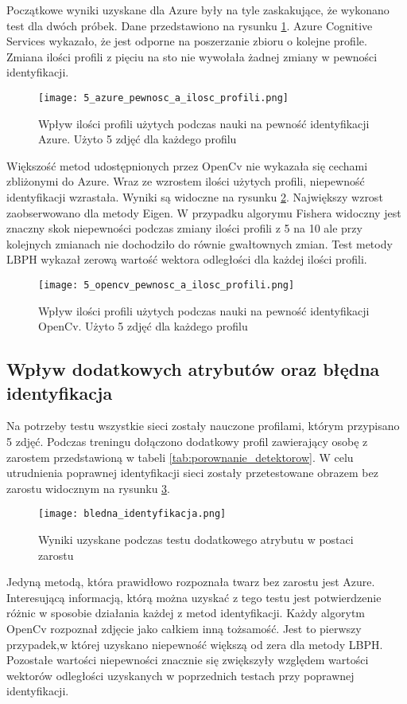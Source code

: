 Początkowe wyniki uzyskane dla Azure były na tyle zaskakujące, że wykonano test dla dwóch próbek. Dane przedstawiono na rysunku \ref{fig:azure_5__profile}. Azure Cognitive Services wykazało, że jest odporne na poszerzanie zbioru o kolejne profile. Zmiana ilości profili z pięciu na sto nie wywołała żadnej zmiany w pewności identyfikacji.
\begin{figure}[H]
	\centering
	\texttt{[image: 5\_azure\_pewnosc\_a\_ilosc\_profili.png]}
	\caption{Wpływ ilości profili użytych podczas nauki na pewność identyfikacji Azure. Użyto 5 zdjęć dla każdego profilu}
	\label{fig:azure_5__profile}
\end{figure}
Większość metod udostępnionych przez OpenCv nie wykazała się cechami zbliżonymi do Azure. Wraz ze wzrostem ilości użytych profili, niepewność identyfikacji wzrastała. Wyniki są widoczne na rysunku \ref{fig:opencv_5__profile}. Największy wzrost zaobserwowano dla metody Eigen. W przypadku algorymu Fishera widoczny jest znaczny skok niepewności podczas zmiany ilości profili z 5 na 10 ale przy kolejnych zmianach nie dochodziło do równie gwałtownych zmian. Test metody LBPH wykazał zerową wartość wektora odległości dla każdej ilości profili.
\begin{figure}[H]
	\centering
	\texttt{[image: 5\_opencv\_pewnosc\_a\_ilosc\_profili.png]}
	\caption{Wpływ ilości profili użytych podczas nauki na pewność identyfikacji OpenCv. Użyto 5 zdjęć dla każdego profilu}
	\label{fig:opencv_5__profile}
\end{figure}

\subsection{Wpływ dodatkowych atrybutów oraz błędna identyfikacja}
Na potrzeby testu wszystkie sieci zostały nauczone profilami, którym przypisano 5 zdjęć. Podczas treningu dołączono dodatkowy profil zawierający osobę z zarostem przedstawioną w tabeli \ref{tab:porownanie_detektorow}. W celu utrudnienia poprawnej identyfikacji sieci zostały przetestowane obrazem bez zarostu widocznym na rysunku \ref{fig:bledna_identyfikacja}.
\begin{figure}[H]
	\centering
	\texttt{[image: bledna\_identyfikacja.png]}
	\caption{Wyniki uzyskane podczas testu dodatkowego atrybutu w postaci zarostu}
	\label{fig:bledna_identyfikacja}
\end{figure}
Jedyną metodą, która prawidłowo rozpoznała twarz bez zarostu jest Azure. Interesującą informacją, którą można uzyskać z tego testu jest potwierdzenie różnic w sposobie działania każdej z metod identyfikacji. Każdy algorytm OpenCv rozpoznał zdjęcie jako całkiem inną tożsamość. Jest to pierwszy przypadek,w której uzyskano niepewność większą od zera dla metody LBPH. Pozostałe wartości niepewności znacznie się zwiększyły względem wartości wektorów odległości uzyskanych w poprzednich testach przy poprawnej identyfikacji.

